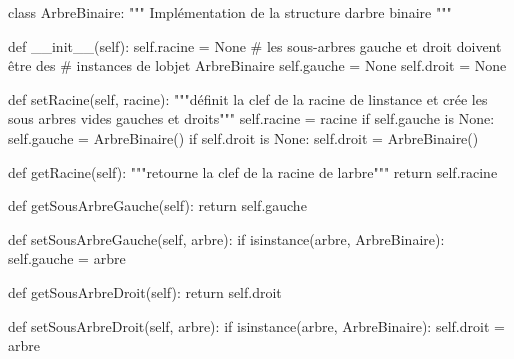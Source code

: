 \documentclass[
  letterpaper,
  DIV=11,
  numbers=noendperiod]{scrartcl}
\newenvironment{Shaded}{\begin{snugshade}}{\end{snugshade}}
\newcommand{\BuiltInTok}[1]{\textcolor[rgb]{0.00,0.23,0.31}{#1}}
\newcommand{\CommentTok}[1]{\textcolor[rgb]{0.37,0.37,0.37}{#1}}
\newcommand{\ControlFlowTok}[1]{\textcolor[rgb]{0.00,0.23,0.31}{#1}}
\newcommand{\FunctionTok}[1]{\textcolor[rgb]{0.28,0.35,0.67}{#1}}
\newcommand{\KeywordTok}[1]{\textcolor[rgb]{0.00,0.23,0.31}{#1}}
\newcommand{\NormalTok}[1]{\textcolor[rgb]{0.00,0.23,0.31}{#1}}
\newcommand{\OperatorTok}[1]{\textcolor[rgb]{0.37,0.37,0.37}{#1}}
\newcommand{\VariableTok}[1]{\textcolor[rgb]{0.07,0.07,0.07}{#1}}
\begin{document}
\begin{Shaded}
\begin{Highlighting}[]
\KeywordTok{class}\NormalTok{ ArbreBinaire:}
    \CommentTok{""" Implémentation de la structure d\textquotesingle{}arbre binaire """}

    \KeywordTok{def} \FunctionTok{\_\_init\_\_}\NormalTok{(}\VariableTok{self}\NormalTok{):}
        \VariableTok{self}\NormalTok{.racine }\OperatorTok{=} \VariableTok{None}
        \CommentTok{\# les sous{-}arbres gauche et droit doivent être des }
        \CommentTok{\# instances de l\textquotesingle{}objet ArbreBinaire}
        \VariableTok{self}\NormalTok{.gauche }\OperatorTok{=} \VariableTok{None}
        \VariableTok{self}\NormalTok{.droit }\OperatorTok{=} \VariableTok{None}

    \KeywordTok{def}\NormalTok{ setRacine(}\VariableTok{self}\NormalTok{, racine):}
        \CommentTok{"""définit la clef de la racine de l\textquotesingle{}instance}
\CommentTok{         et crée les sous arbres vides gauches et droits"""}
        \VariableTok{self}\NormalTok{.racine }\OperatorTok{=}\NormalTok{ racine}
        \ControlFlowTok{if} \VariableTok{self}\NormalTok{.gauche }\KeywordTok{is} \VariableTok{None}\NormalTok{:}
            \VariableTok{self}\NormalTok{.gauche }\OperatorTok{=}\NormalTok{ ArbreBinaire()}
        \ControlFlowTok{if} \VariableTok{self}\NormalTok{.droit }\KeywordTok{is} \VariableTok{None}\NormalTok{:}
            \VariableTok{self}\NormalTok{.droit }\OperatorTok{=}\NormalTok{ ArbreBinaire()}
    
    \KeywordTok{def}\NormalTok{ getRacine(}\VariableTok{self}\NormalTok{):}
        \CommentTok{"""retourne la clef de la racine de l\textquotesingle{}arbre"""}
        \ControlFlowTok{return} \VariableTok{self}\NormalTok{.racine}

    \KeywordTok{def}\NormalTok{ getSousArbreGauche(}\VariableTok{self}\NormalTok{):}
        \ControlFlowTok{return} \VariableTok{self}\NormalTok{.gauche}

    \KeywordTok{def}\NormalTok{ setSousArbreGauche(}\VariableTok{self}\NormalTok{, arbre):}
        \ControlFlowTok{if} \BuiltInTok{isinstance}\NormalTok{(arbre, ArbreBinaire):}
            \VariableTok{self}\NormalTok{.gauche }\OperatorTok{=}\NormalTok{ arbre}

    \KeywordTok{def}\NormalTok{ getSousArbreDroit(}\VariableTok{self}\NormalTok{):}
        \ControlFlowTok{return} \VariableTok{self}\NormalTok{.droit}

    \KeywordTok{def}\NormalTok{ setSousArbreDroit(}\VariableTok{self}\NormalTok{, arbre):}
        \ControlFlowTok{if} \BuiltInTok{isinstance}\NormalTok{(arbre, ArbreBinaire):}
            \VariableTok{self}\NormalTok{.droit }\OperatorTok{=}\NormalTok{ arbre}


\end{Highlighting}
\end{Shaded}
\end{document}
